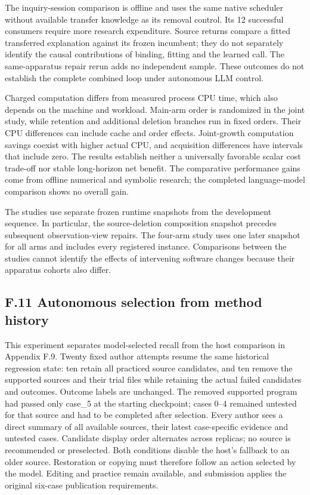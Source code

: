 \documentclass[twoside,11pt]{article}
\begin{document}
The inquiry-session comparison is offline and uses the same native scheduler
without available transfer knowledge as its removal control. Its 12 successful
consumers require more research expenditure. Source returns compare a fitted
transferred explanation against its frozen incumbent; they do not separately
identify the causal contributions of binding, fitting and the learned call.
The same-apparatus repair rerun adds no independent sample. These outcomes do not
establish the complete combined loop under autonomous LLM control.


Charged computation differs from measured process CPU time, which also depends
on the machine and workload. Main-arm order is randomized in the joint study,
while retention and additional deletion branches run in fixed orders. Their CPU
differences can include cache and order effects. Joint-growth computation savings
coexist with higher actual CPU, and acquisition differences have intervals that
include zero. The results establish neither a universally favorable scalar cost
trade-off nor stable long-horizon net benefit. The comparative performance
gains come from offline numerical and symbolic research; the completed
language-model comparison shows no overall gain.


The studies use separate frozen runtime snapshots from the development sequence. In particular, the source-deletion composition snapshot precedes subsequent observation-view repairs. The four-arm study uses one later snapshot for all arms and includes every registered instance. Comparisons between the studies cannot identify the effects of intervening software changes because their apparatus cohorts also differ.


\subsection*{F.11 Autonomous selection from method history}

This experiment separates model-selected recall from the host comparison in
Appendix F.9. Twenty fixed author attempts resume the same historical regression
state: ten retain all practiced source candidates, and ten remove the supported
sources and their trial files while retaining the actual failed candidates and
outcomes. Outcome labels are unchanged. The removed supported program had passed
only case\_5 at the starting checkpoint; cases 0–4 remained untested for that
source and had to be completed after selection. Every author sees a direct
summary of all available sources, their latest case-specific evidence and untested cases.
Candidate display order alternates across replicas; no source is recommended or
preselected. Both conditions disable the host's fallback to an older source.
Restoration or copying must therefore follow an action selected by the model.
Editing and practice remain available, and submission applies the original
six-case publication requirements.
\end{document}
